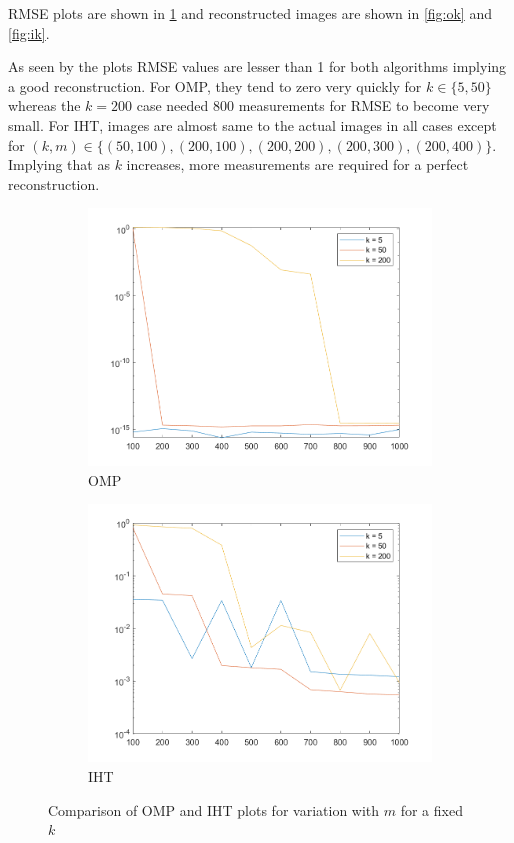 \documentclass[a4paper, landscape]{article}
\begin{document}
RMSE plots are shown in \ref{fig:ck} and reconstructed images are shown in \ref{fig:ok} and \ref{fig:ik}.

As seen by the plots RMSE values are lesser than 1 for both algorithms implying a good reconstruction. For OMP, they tend to zero very quickly for $k\in\{5,50\}$ whereas the $k=200$ case needed $800$ measurements for RMSE to become very small. For IHT, images are almost same to the actual images in all cases except for $(k,m)\in\{(50,100), (200,100), (200,200), (200,300), (200,400)\}$. Implying that as $k$ increases, more measurements are required for a perfect reconstruction.
\begin{figure}[H]
    \centering
    \begin{subfigure}{0.45\linewidth}
        \centering
        \includegraphics[width=\linewidth]{omp/plot k.png}
        \caption{OMP}
    \end{subfigure}
    \begin{subfigure}{0.45\linewidth}
        \centering
        \includegraphics[width=\linewidth]{iht/plot k.png}
        \caption{IHT}
    \end{subfigure}
    \caption{Comparison of OMP and IHT plots for variation with $m$ for a fixed $k$}
    \label{fig:ck}
\end{figure}
\end{document}
